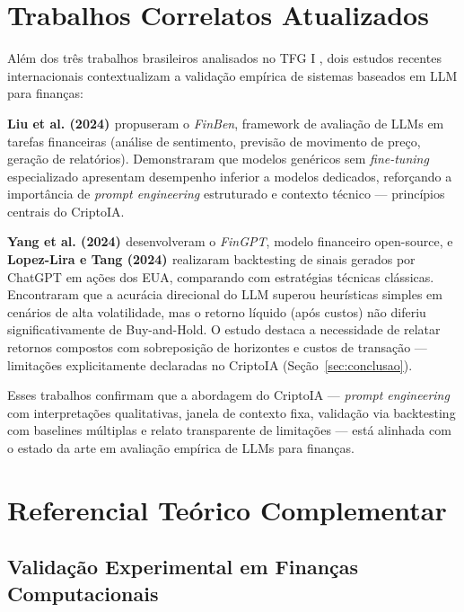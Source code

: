 \documentclass[conference]{IEEEtran}
\begin{document}
\section{Trabalhos Correlatos Atualizados}
\label{sec:correlatos}

Além dos três trabalhos brasileiros analisados no TFG I \cite{monteiro2026ssinnova,silvajunior2022allbot,franciscon2023lstm}, dois estudos recentes internacionais contextualizam a validação empírica de sistemas baseados em LLM para finanças:

\textbf{Liu et al. (2024) \cite{zhang2024finben}} propuseram o \textit{FinBen}, framework de avaliação de LLMs em tarefas financeiras (análise de sentimento, previsão de movimento de preço, geração de relatórios). Demonstraram que modelos genéricos sem \textit{fine-tuning} especializado apresentam desempenho inferior a modelos dedicados, reforçando a importância de \textit{prompt engineering} estruturado e contexto técnico — princípios centrais do CriptoIA.

\textbf{Yang et al. (2024) \cite{yang2024fingpt}} desenvolveram o \textit{FinGPT}, modelo financeiro open-source, e \textbf{Lopez-Lira e Tang (2024) \cite{lopez2024chatgpt}} realizaram backtesting de sinais gerados por ChatGPT em ações dos EUA, comparando com estratégias técnicas clássicas. Encontraram que a acurácia direcional do LLM superou heurísticas simples em cenários de alta volatilidade, mas o retorno líquido (após custos) não diferiu significativamente de Buy-and-Hold. O estudo destaca a necessidade de relatar retornos compostos com sobreposição de horizontes e custos de transação — limitações explicitamente declaradas no CriptoIA (Seção~\ref{sec:conclusao}).

Esses trabalhos confirmam que a abordagem do CriptoIA — \textit{prompt engineering} com interpretações qualitativas, janela de contexto fixa, validação via backtesting com baselines múltiplas e relato transparente de limitações — está alinhada com o estado da arte em avaliação empírica de LLMs para finanças.

\section{Referencial Teórico Complementar}
\label{sec:referencial}

\subsection{Validação Experimental em Finanças Computacionais}
\end{document}
